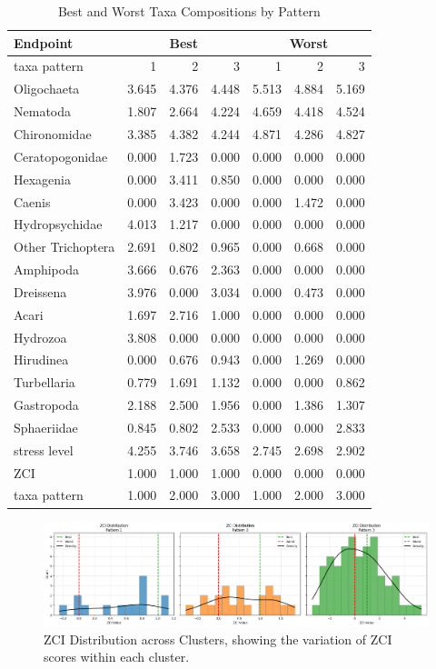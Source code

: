 \begin{table}[!h]
\centering
\caption{Best and Worst Taxa Compositions by Pattern}
\label{tab:endpoints}
\begin{tabular}{l|rrr|rrr}
\toprule
Endpoint & \multicolumn{3}{c}{\textbf{Best}} & \multicolumn{3}{c}{\textbf{Worst}} \\
\hline
taxa pattern & 1 & 2 & 3 & 1 & 2 & 3 \\
\midrule
Oligochaeta & 3.645 & 4.376 & 4.448 & 5.513 & 4.884 & 5.169 \\
Nematoda & 1.807 & 2.664 & 4.224 & 4.659 & 4.418 & 4.524 \\
Chironomidae & 3.385 & 4.382 & 4.244 & 4.871 & 4.286 & 4.827 \\
Ceratopogonidae & 0.000 & 1.723 & 0.000 & 0.000 & 0.000 & 0.000 \\
Hexagenia & 0.000 & 3.411 & 0.850 & 0.000 & 0.000 & 0.000 \\
Caenis & 0.000 & 3.423 & 0.000 & 0.000 & 1.472 & 0.000 \\
Hydropsychidae & 4.013 & 1.217 & 0.000 & 0.000 & 0.000 & 0.000 \\
Other Trichoptera & 2.691 & 0.802 & 0.965 & 0.000 & 0.668 & 0.000 \\
Amphipoda & 3.666 & 0.676 & 2.363 & 0.000 & 0.000 & 0.000 \\
Dreissena & 3.976 & 0.000 & 3.034 & 0.000 & 0.473 & 0.000 \\
Acari & 1.697 & 2.716 & 1.000 & 0.000 & 0.000 & 0.000 \\
Hydrozoa & 3.808 & 0.000 & 0.000 & 0.000 & 0.000 & 0.000 \\
Hirudinea & 0.000 & 0.676 & 0.943 & 0.000 & 1.269 & 0.000 \\
Turbellaria & 0.779 & 1.691 & 1.132 & 0.000 & 0.000 & 0.862 \\
Gastropoda & 2.188 & 2.500 & 1.956 & 0.000 & 1.386 & 1.307 \\
Sphaeriidae & 0.845 & 0.802 & 2.533 & 0.000 & 0.000 & 2.833 \\
\midrule
stress level & 4.255 & 3.746 & 3.658 & 2.745 & 2.698 & 2.902 \\
ZCI & 1.000 & 1.000 & 1.000 & 0.000 & 0.000 & 0.000 \\
taxa pattern & 1.000 & 2.000 & 3.000 & 1.000 & 2.000 & 3.000 \\
\bottomrule
\end{tabular}
\end{table}

\begin{figure}[!h]
    \centering
    \includegraphics[width=\textwidth]{../results/preliminary_results/ZCI_distribution_across_clusters.png}
    \caption{ZCI Distribution across Clusters, showing the variation of ZCI scores within each cluster.}
    \label{fig:zci_distribution_across_clusters}
\end{figure}

